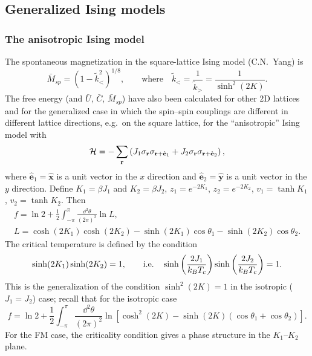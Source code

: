 \subsection{Generalized Ising models}
\subsubsection*{The anisotropic Ising model}

The spontaneous magnetization in the square-lattice Ising model (C.N.~Yang) is
\begin{equation}
  \bar M_{sp} = (1-\tilde k_<^2)^{1/8},\qquad\text{where}\quad \tilde k_< = \frac{1}{\tilde k_>} = \frac{1}{\sinh^2(2K)}.
\end{equation}
The free energy (and $\bar U$, $\bar C$, $\bar M_{sp}$) have also been calculated for other 2D lattices
and for the generalized case in which the spin--spin couplings are different in different lattice
directions, e.g.\ on the square lattice, for the ``anisotropic'' Ising model with
\begin{equation}
  \mathcal{H} = -\sum_{\mathbf r}\left(J_1\sigma_{\mathbf r}\sigma_{\mathbf r+\hat{\mathbf e}_1}
         + J_2\sigma_{\mathbf r}\sigma_{\mathbf r+\hat{\mathbf e}_2}\right),
\end{equation}
where $\hat{\mathbf e}_1 = \hat{\mathbf x}$ is a unit vector in the $x$ direction and
$\hat{\mathbf e}_2 = \hat{\mathbf y}$ is a unit vector in the $y$ direction. Define $K_1 = \beta J_1$
and $K_2 = \beta J_2$, $z_1 = e^{-2K_1}$, $z_2 = e^{-2K_2}$, $v_1 = \tanh K_1$, $v_2 = \tanh K_2$. Then
\begin{gather}
  f = \ln 2 + \frac{1}{2}\int_{-\pi}^{\pi}\frac{\dd^2\theta}{(2\pi)^2}\ln L,\nonumber\\
  L = \cosh(2K_1)\cosh(2K_2) - \sinh(2K_1)\cos\theta_1 - \sinh(2K_2)\cos\theta_2 .
\end{gather}
The critical temperature is defined by the condition
\begin{equation}
  \sinh(2K_1)\sinh(2K_2) = 1,\qquad\text{i.e.}\quad
  \sinh\left(\frac{2J_1}{k_{B} T_c}\right)\sinh\left(\frac{2J_2}{k_{B} T_c}\right) = 1 .
\end{equation}
This is the generalization of the condition $\sinh^2(2K) = 1$ in the isotropic ($J_1 = J_2$) case;
recall that for the isotropic case
\begin{equation}
  f = \ln 2 + \frac{1}{2}\int_{-\pi}^{\pi}\frac{\dd^2\theta}{(2\pi)^2}\ln\left[\cosh^2(2K)-\sinh(2K)(\cos\theta_1+\cos\theta_2)\right].
\end{equation}
For the FM case, the criticality condition gives a phase structure in the $K_1$--$K_2$ plane.

